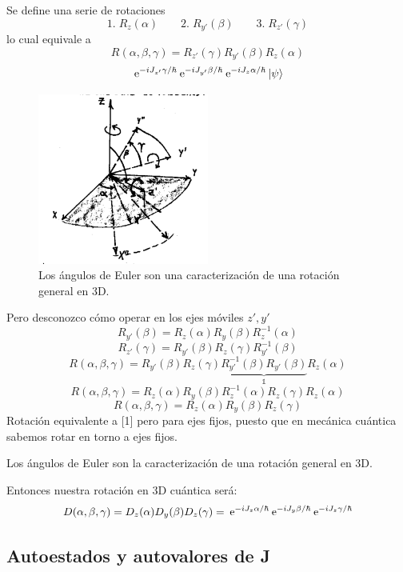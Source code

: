 \documentclass[10pt,oneside]{CBFT_book}
\begin{document}
Se define una serie de rotaciones 
\[
	1.\; R_{z}(\alpha) \qquad 2.\; R_{y'}(\beta)\qquad 3.\; R_{z'}(\gamma)
\]
lo cual equivale a
\[
	R(\alpha,\beta,\gamma) = R_{z'}(\gamma) R_{y'}(\beta) R_{z}(\alpha)
\]
\[
	\:\mathrm{e}^{-i J_{z'}\gamma/\hbar} \:\mathrm{e}^{-i J_{y'}\beta/\hbar}  \:\mathrm{e}^{-i J_z\alpha/\hbar} 
	\Ket{\psi}
\]
\begin{figure}[!htb]
	\begin{center}
	\includegraphics[width=0.5\textwidth]{images/teo2_11.pdf}
	\end{center}
	\caption{Los ángulos de Euler son una caracterización de una rotación general en 3D.}
\end{figure} 
Pero desconozco cómo operar en los ejes móviles $z',y'$
\[
	R_{y'}(\beta) = R_{z}(\alpha) R_{y}(\beta) R_{z}^{-1}(\alpha) 
\]
\[
	R_{z'}(\gamma) = R_{y'}(\beta) R_{z}(\gamma) R_{y'}^{-1}(\beta) 
\]
\[
	R(\alpha,\beta,\gamma) =
	R_{y'}(\beta) R_{z}(\gamma) \underbrace{R_{y'}^{-1}(\beta)R_{y'}(\beta)}_{\mathbb{1}}R_{z}(\alpha) 
\]
\[
	R(\alpha,\beta,\gamma) =
	R_{z}(\alpha) R_{y}(\beta) R_{z}^{-1}(\alpha) R_{z}(\gamma) R_{z}(\alpha)  
\]
\[
	R(\alpha,\beta,\gamma) = R_{z}(\alpha) R_{y}(\beta) R_{z}(\gamma)
\]
Rotación equivalente a [1] pero para ejes fijos, puesto que en mecánica cuántica sabemos rotar en torno a 
ejes fijos.

Los ángulos de Euler son la caracterización de una rotación general en 3D.

Entonces nuestra rotación en 3D cuántica será:
\[
	D(\alpha,\beta,\gamma) = D_z(\alpha) D_y(\beta) D_z(\gamma)  =
	\:\mathrm{e}^{-i J_z\alpha/\hbar} \:\mathrm{e}^{-i J_y\beta/\hbar} \:\mathrm{e}^{-i J_z\gamma/\hbar}
\]

\subsection{Autoestados y autovalores de J}
\end{document}
